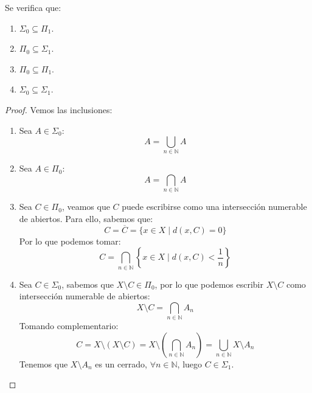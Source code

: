 \begin{prop}
    Se verifica que:
    \begin{enumerate}
        \item $\Sigma_0 \subseteq \Pi_1$.
        \item $\Pi_0 \subseteq \Sigma_1$.
        \item $\Pi_0\subseteq \Pi_1$.
        \item $\Sigma_0\subseteq \Sigma_1$.
    \end{enumerate}
    \begin{proof}
        Vemos las inclusiones:
        \begin{enumerate}
            \item Sea $A\in \Sigma_0$:
                \begin{equation*}
                    A = \bigcup_{n\in \mathbb{N}} A
                \end{equation*}
            \item Sea $A\in \Pi_0$:
                \begin{equation*}
                    A = \bigcap_{n\in \mathbb{N}} A
                \end{equation*}
            \item Sea $C\in \Pi_0$, veamos que $C$ puede escribirse como una intersección numerable de abiertos. Para ello, sabemos que:
                \begin{equation*}
                    C = \overline{C} = \{x\in X \mid d(x,C) = 0\}
                \end{equation*}
                Por lo que podemos tomar:
                \begin{equation*}
                    C = \bigcap_{n\in \mathbb{N}} \left\{x\in X \mid d(x,C) < \dfrac{1}{n}\right\}
                \end{equation*}
            \item Sea $C\in \Sigma_0$, sabemos que $X\setminus C\in \Pi_0$, por lo que podemos escribir $X\setminus C$ como intersección numerable de abiertos:
                \begin{equation*}
                    X\setminus C = \bigcap_{n\in \mathbb{N}} A_n
                \end{equation*}
                Tomando complementario:
                \begin{equation*}
                    C = X\setminus(X\setminus C) = X\setminus\left(\bigcap_{n\in \mathbb{N}} A_n\right) = \bigcup_{n\in \mathbb{N}} X\setminus A_n
                \end{equation*}
                Tenemos que $X\setminus A_n$ es un cerrado, $\forall n\in \mathbb{N}$, luego $C\in \Sigma_1$.
        \end{enumerate}
    \end{proof}
\end{prop}
